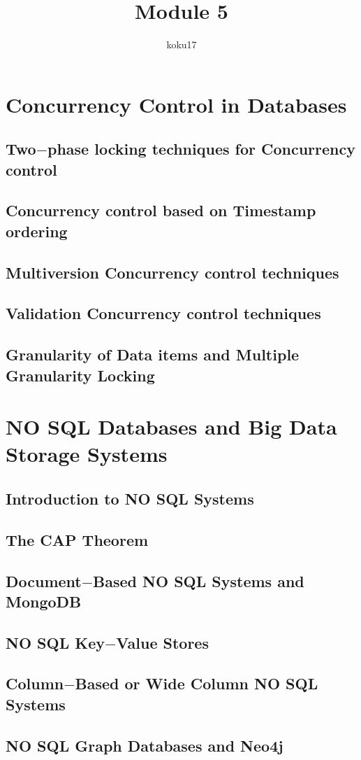 \documentclass{article}
\title{Module 5}
\author{koku17}
\begin{document}
	\maketitle \thispagestyle{empty} \newpage
	\tableofcontents \thispagestyle{empty} \newpage
	\section{Concurrency Control in Databases}
	\subsection{Two$-$phase locking techniques for Concurrency control}
	\subsection{Concurrency control based on Timestamp ordering}
	\subsection{Multiversion Concurrency control techniques}
	\subsection{Validation Concurrency control techniques}
	\subsection{Granularity of Data items and Multiple Granularity Locking}

	\section{NO SQL Databases and Big Data Storage Systems}
	\subsection{Introduction to NO SQL Systems}
	\subsection{The CAP Theorem}
	\subsection{Document$-$Based NO SQL Systems and MongoDB}
	\subsection{NO SQL Key$-$Value Stores}
	\subsection{Column$-$Based or Wide Column NO SQL Systems}
	\subsection{NO SQL Graph Databases and Neo4j}
\end{document}
